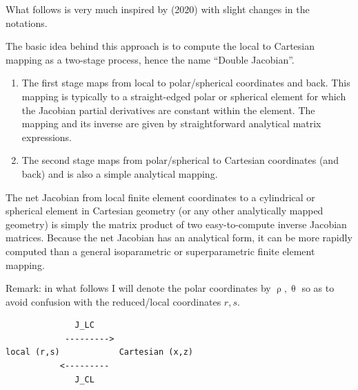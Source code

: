 What follows is very much inspired by \textcite{moth20} (2020) with slight changes in the notations.

The basic idea behind this approach is to compute the local to Cartesian mapping 
as a two-stage process, hence the name ``Double Jacobian''. 

\begin{enumerate}
\item 
The first stage maps from local to polar/spherical coordinates and back. This mapping is typically 
to a straight-edged polar or spherical element for which the Jacobian partial derivatives 
are constant within the element. The mapping and its inverse are given by straightforward analytical matrix expressions. 
\item The second stage maps from polar/spherical to Cartesian coordinates (and back) and is also a simple analytical mapping. 
\end{enumerate}
The net Jacobian from local finite element coordinates to a cylindrical or spherical element in Cartesian geometry 
(or any other analytically mapped geometry) is simply the matrix product of two easy-to-compute inverse Jacobian matrices. 
Because the net Jacobian has an analytical form, it can be more rapidly computed than a general 
isoparametric or superparametric finite element mapping.

Remark: in what follows I will denote the polar coordinates by $\uprho,\uptheta$ 
so as to avoid confusion with the reduced/local coordinates $r,s$.

\begin{verbatim}
              J_LC
            --------->          
local (r,s)            Cartesian (x,z)
           <---------          
              J_CL
\end{verbatim}



